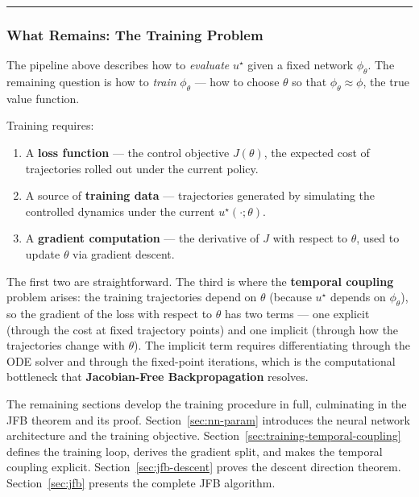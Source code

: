 \documentclass{article}
\begin{document}
\medskip\hrule\medskip

\subsubsection{What Remains: The Training Problem}

\begin{tldrbox}
The pipeline above describes how to \textit{evaluate} $u^\star$ given a fixed
network $\phi_\theta$. The remaining question is how to \textit{train}
$\phi_\theta$ --- how to choose $\theta$ so that $\phi_\theta \approx \phi$,
the true value function.

Training requires:
\begin{enumerate}
    \item A \textbf{loss function} --- the control objective $J(\theta)$,
          the expected cost of trajectories rolled out under the current policy.
    \item A source of \textbf{training data} --- trajectories generated by
          simulating the controlled dynamics under the current
          $u^\star(\cdot;\theta)$.
    \item A \textbf{gradient computation} --- the derivative of $J$ with
          respect to $\theta$, used to update $\theta$ via gradient descent.
\end{enumerate}

The first two are straightforward. The third is where the \textbf{temporal
coupling} problem arises: the training trajectories depend on $\theta$ (because
$u^\star$ depends on $\phi_\theta$), so the gradient of the loss with respect
to $\theta$ has two terms --- one explicit (through the cost at fixed trajectory
points) and one implicit (through how the trajectories change with $\theta$).
The implicit term requires differentiating through the ODE solver and through
the fixed-point iterations, which is the computational bottleneck that
\textbf{Jacobian-Free Backpropagation} resolves.

The remaining sections develop the training procedure in full, culminating in the
JFB theorem and its proof. Section~\ref{sec:nn-param} introduces the neural network
architecture and the training objective. Section~\ref{sec:training-temporal-coupling}
defines the training loop, derives the gradient split, and makes the temporal
coupling explicit. Section~\ref{sec:jfb-descent} proves the descent direction
theorem. Section~\ref{sec:jfb} presents the complete JFB algorithm.
\end{tldrbox}
\end{document}
